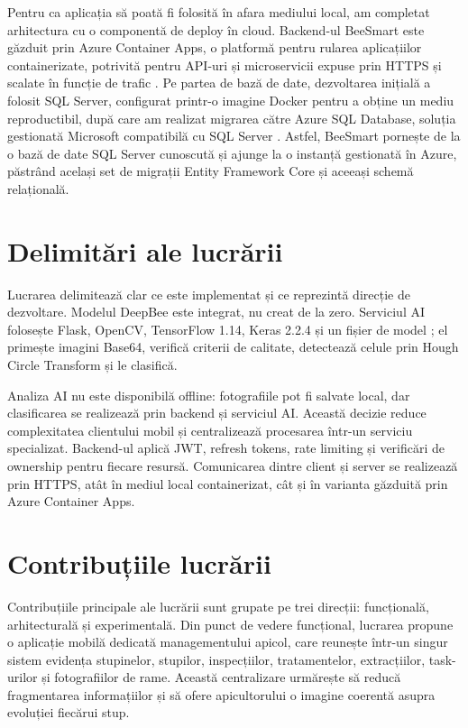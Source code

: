 Pentru ca aplicația să poată fi folosită în afara mediului local, am completat arhitectura cu o componentă de deploy în cloud. Backend-ul BeeSmart este găzduit prin Azure Container Apps, o platformă pentru rularea aplicațiilor containerizate, potrivită pentru API-uri și microservicii expuse prin HTTPS și scalate în funcție de trafic \cite{azureContainerAppsDocs}. Pe partea de bază de date, dezvoltarea inițială a folosit SQL Server, configurat printr-o imagine Docker pentru a obține un mediu reproductibil, după care am realizat migrarea către Azure SQL Database, soluția gestionată Microsoft compatibilă cu SQL Server \cite{azureSqlDocs}. Astfel, BeeSmart pornește de la o bază de date SQL Server cunoscută și ajunge la o instanță gestionată în Azure, păstrând același set de migrații Entity Framework Core și aceeași schemă relațională.

\section{Delimitări ale lucrării}

Lucrarea delimitează clar ce este implementat și ce reprezintă direcție de dezvoltare. Modelul DeepBee este integrat, nu creat de la zero. Serviciul AI folosește Flask, OpenCV, TensorFlow 1.14, Keras 2.2.4 și un fișier de model ; el primește imagini Base64, verifică criterii de calitate, detectează celule prin Hough Circle Transform și le clasifică.

Analiza AI nu este disponibilă offline: fotografiile pot fi salvate local, dar clasificarea se realizează prin backend și serviciul AI. Această decizie reduce complexitatea clientului mobil și centralizează procesarea într-un serviciu specializat. Backend-ul aplică JWT, refresh tokens, rate limiting și verificări de ownership pentru fiecare resursă. Comunicarea dintre client și server se realizează prin HTTPS, atât în mediul local containerizat, cât și în varianta găzduită prin Azure Container Apps.

\section{Contribuțiile lucrării
}
Contribuțiile principale ale lucrării sunt grupate pe trei direcții: funcțională, arhitecturală și experimentală. Din punct de vedere funcțional, lucrarea propune o aplicație mobilă dedicată managementului apicol, care reunește într-un singur sistem evidența stupinelor, stupilor, inspecțiilor, tratamentelor, extracțiilor, task-urilor și fotografiilor de rame. Această centralizare urmărește să reducă fragmentarea informațiilor și să ofere apicultorului o imagine coerentă asupra evoluției fiecărui stup.

